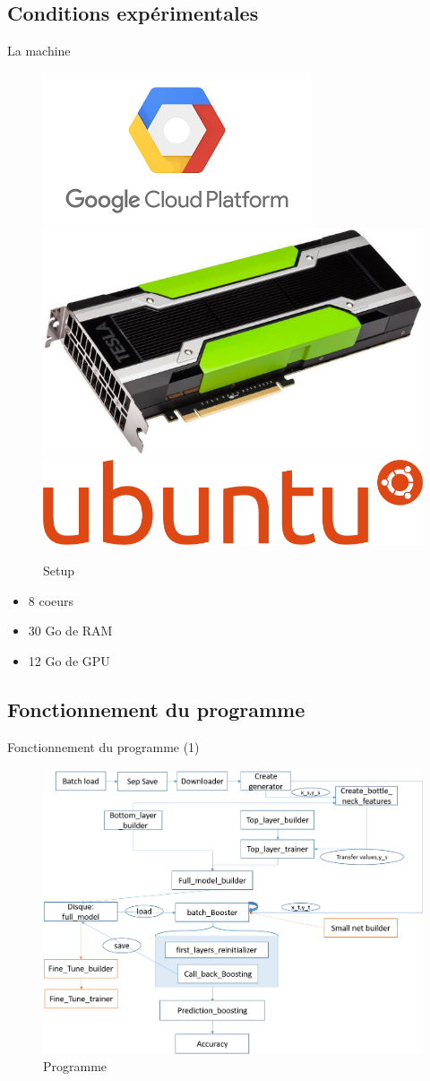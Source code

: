 \documentclass{beamer}
\begin{document}
    \subsection{Conditions expérimentales}
    \begin{frame}{La machine}
      \begin{figure}
          \includegraphics[width=.3\textwidth]{gcloud.png}
          \includegraphics[width=.3\textwidth]{k80.jpg}
          \includegraphics[width=.3\textwidth]{ubuntu.png}
          \caption{Setup}
          \label{Setup}
       \end{figure}
      \begin{itemize}
      	\item 8 coeurs
        \item 30 Go de RAM
        \item 12 Go de GPU
      \end{itemize}
    \end{frame}

    
    \subsection{Fonctionnement du programme}
    \begin{frame}{Fonctionnement du programme (1)}
      \begin{figure}
          \includegraphics[height=.8\textheight]{programme.png}
          \caption{Programme}
          \label{Programme}
       \end{figure}
    \end{frame}
    
\end{document}
